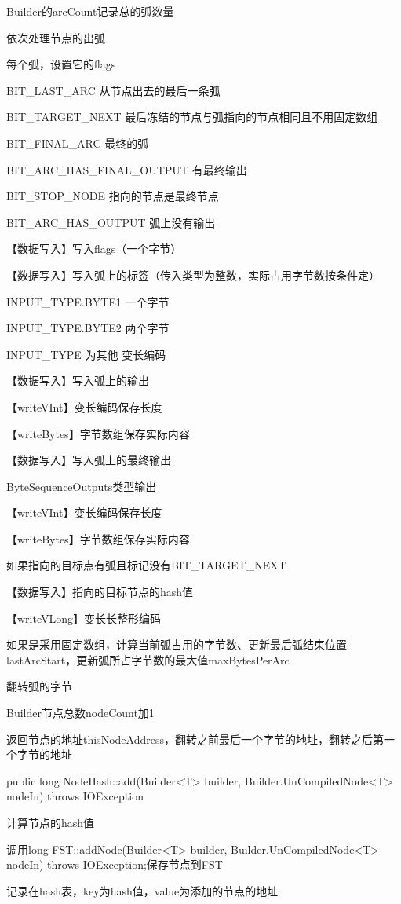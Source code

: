 \documentclass{article}
\begin{document}
Builder的arcCount记录总的弧数量

依次处理节点的出弧

每个弧，设置它的flags

BIT\_LAST\_ARC 从节点出去的最后一条弧

BIT\_TARGET\_NEXT 最后冻结的节点与弧指向的节点相同且不用固定数组

BIT\_FINAL\_ARC 最终的弧

BIT\_ARC\_HAS\_FINAL\_OUTPUT 有最终输出

BIT\_STOP\_NODE 指向的节点是最终节点

BIT\_ARC\_HAS\_OUTPUT 弧上没有输出

【数据写入】写入flags（一个字节）

【数据写入】写入弧上的标签（传入类型为整数，实际占用字节数按条件定）

INPUT\_TYPE.BYTE1 一个字节

INPUT\_TYPE.BYTE2 两个字节

INPUT\_TYPE 为其他 变长编码

【数据写入】写入弧上的输出

【writeVInt】变长编码保存长度

【writeBytes】字节数组保存实际内容

【数据写入】写入弧上的最终输出

ByteSequenceOutputs类型输出

【writeVInt】变长编码保存长度

【writeBytes】字节数组保存实际内容

如果指向的目标点有弧且标记没有BIT\_TARGET\_NEXT

【数据写入】指向的目标节点的hash值

【writeVLong】变长长整形编码


如果是采用固定数组，计算当前弧占用的字节数、更新最后弧结束位置lastArcStart，更新弧所占字节数的最大值maxBytesPerArc

翻转弧的字节

Builder节点总数nodeCount加1

返回节点的地址thisNodeAddress，翻转之前最后一个字节的地址，翻转之后第一个字节的地址


public long NodeHash::add(Builder<T> builder, Builder.UnCompiledNode<T> nodeIn) throws IOException

计算节点的hash值

调用long FST::addNode(Builder<T> builder, Builder.UnCompiledNode<T> nodeIn) throws IOException;保存节点到FST

记录在hash表，key为hash值，value为添加的节点的地址
\end{document}
